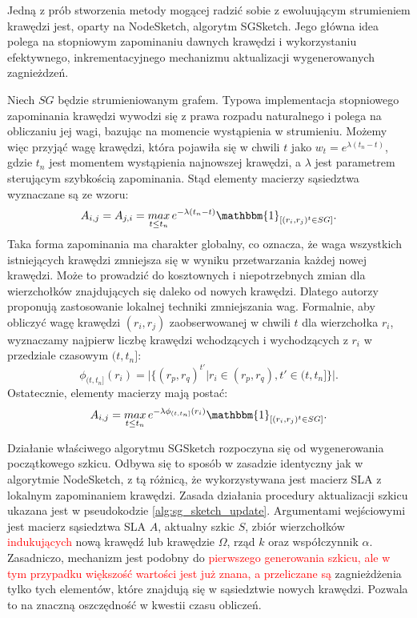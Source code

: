             Jedną z prób stworzenia metody mogącej radzić sobie z ewoluującym strumieniem krawędzi jest, oparty na NodeSketch, algorytm SGSketch\cite{Yang_Qu_Yang_Wang_Cudre-Mauroux_2022}. Jego główna idea polega na stopniowym zapominaniu dawnych krawędzi i wykorzystaniu efektywnego, inkrementacyjnego mechanizmu aktualizacji wygenerowanych zagnieżdzeń.
            
            Niech $SG$ będzie strumieniowanym grafem. Typowa implementacja stopniowego zapominania krawędzi wywodzi się z prawa rozpadu naturalnego i polega na obliczaniu jej wagi, bazując na momencie wystąpienia w strumieniu. Możemy więc przyjąć wagę krawędzi, która pojawiła się w chwili $t$ jako $w_t = e^{\lambda(t_n - t)}$, gdzie $t_n$ jest momentem wystąpienia najnowszej krawędzi, a $\lambda$ jest parametrem sterującym szybkością zapominania. Stąd elementy macierzy sąsiedztwa wyznaczane są ze wzoru:
            \begin{equation} \label{eq:sg_sketch_1}  
                A_{i,j} = A_{j,i} = \mathop{max}_{t \leq t_n} e^{-\lambda (t_n - t)}\mathbbm{1}_{[(r_i, r_j)^{t} \in SG]}.
            \end{equation}
            Taka forma zapominania ma charakter globalny, co oznacza, że  waga wszystkich istniejących krawędzi zmniejsza się w wyniku przetwarzania każdej nowej krawędzi. Może to prowadzić do kosztownych i niepotrzebnych zmian dla wierzchołków znajdujących się daleko od nowych krawędzi. Dlatego autorzy proponują zastosowanie lokalnej techniki zmniejszania wag. Formalnie, aby obliczyć wagę krawędzi $(r_i, r_j)$ zaobserwowanej w chwili $t$ dla wierzchołka $r_i$, wyznaczamy najpierw liczbę krawędzi wchodzących i wychodzących z $r_i$ w przedziale czasowym $(t,t_n]$: 
            \begin{equation} \label{eq:sg_sketch_2}  
                \phi_{(t,t_n]}(r_i) = \vert \{(r_p, r_q)^{t'} \vert r_i \in (r_p, r_q), t' \in (t,t_n] \} \vert.
            \end{equation}
            Ostatecznie, elementy macierzy mają postać:
            \begin{equation} \label{eq:sg_sketch_3}  
                A_{i,j} = \mathop{max}_{t \leq t_n} e^{-\lambda \phi_{(t,t_n]}(r_i)}\mathbbm{1}_{[(r_i, r_j)^{t} \in SG]}.
            \end{equation}

            Działanie właściwego algorytmu SGSketch rozpoczyna się od wygenerowania początkowego szkicu. Odbywa się to sposób w zasadzie identyczny jak w algorytmie NodeSketch, z tą różnicą, że wykorzystywana jest macierz SLA z lokalnym zapominaniem krawędzi. Zasada działania procedury aktualizacji szkicu ukazana jest w pseudokodzie \ref{alg:sg_sketch_update}. Argumentami wejściowymi jest macierz sąsiedztwa SLA $A$, aktualny szkic $S$, zbiór wierzchołków \textcolor{red}{indukujących} nową krawędź lub krawędzie $\Omega$, rząd $k$ oraz współczynnik $\alpha$. Zasadniczo, mechanizm jest podobny do \textcolor{red}{pierwszego generowania szkicu, ale w tym przypadku większość wartości jest już znana, a przeliczane są} zagnieżdżenia tylko tych elementów, które znajdują się w sąsiedztwie nowych krawędzi. Pozwala to na znaczną oszczędność w kwestii czasu obliczeń. 

